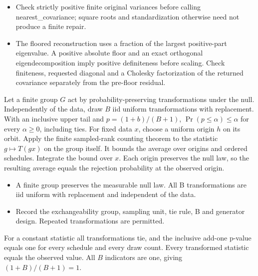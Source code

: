 \expandafter\def\csname statadic@diagnostics@STATADIC-PSD-005\endcsname{\begin{itemize}
\item Check strictly positive finite original variances before calling nearest\_covariance; square roots and standardization otherwise need not produce a finite repair.
\item The floored reconstruction uses a fraction of the largest positive-part eigenvalue. A positive absolute floor and an exact orthogonal eigendecomposition imply positive definiteness before scaling. Check finiteness, requested diagonal and a Cholesky factorization of the returned covariance separately from the pre-floor residual.
\end{itemize}}
\expandafter\def\csname statadic@statement@STATADIC-RANDOMIZATION-004\endcsname{Let a finite group $G$ act by probability-preserving transformations
  under the null. Independently of the data, draw $B$ iid uniform transformations with
  replacement. With an inclusive upper tail and $p=(1+b)/(B+1)$,
  $\Pr(p\le\alpha)\le\alpha$ for every $\alpha\ge0$, including ties.}
\expandafter\def\csname statadic@proof@STATADIC-RANDOMIZATION-004\endcsname{For fixed data $x$, choose a uniform origin $h$ on its orbit.
  Apply the finite sampled-rank counting theorem to the statistic $g\mapsto T(gx)$
  on the group itself. It bounds the average over origins and ordered schedules.
  Integrate the bound over $x$. Each origin preserves the null law, so the resulting
  average equals the rejection probability at the observed origin.}
\expandafter\def\csname statadic@assumptions@STATADIC-RANDOMIZATION-004\endcsname{\begin{itemize}
\item A finite group preserves the measurable null law. All B transformations are iid uniform with replacement and independent of the data.
\end{itemize}}
\expandafter\def\csname statadic@diagnostics@STATADIC-RANDOMIZATION-004\endcsname{\begin{itemize}
\item Record the exchangeability group, sampling unit, tie rule, B and generator design. Repeated transformations are permitted.
\end{itemize}}
\expandafter\def\csname statadic@statement@STATADIC-RANDOMIZATION-005\endcsname{For a constant statistic all transformations tie, and the
  inclusive add-one p-value equals one for every schedule and every draw count.}
\expandafter\def\csname statadic@proof@STATADIC-RANDOMIZATION-005\endcsname{Every transformed statistic equals the observed value. All $B$
  indicators are one, giving $(1+B)/(B+1)=1$.}
